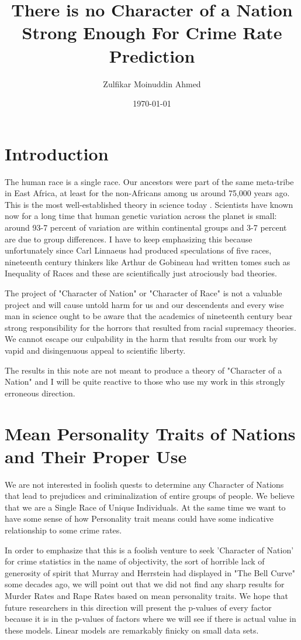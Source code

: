 \documentclass{amsart}
\title{There is no Character of a Nation Strong Enough For Crime Rate Prediction}
\author{Zulfikar Moinuddin Ahmed}
\date{\today}
\begin{document}
\maketitle

\section{Introduction}
The human race is a single race.  Our ancestors were part of the same meta-tribe in East Africa, at least for the non-Africans among us around 75,000 years ago.  This is the most well-established theory in science today \cite{SM18}.  Scientists have known now for a long time that human genetic variation across the planet is small: around 93-7 percent of variation are within continental groups and 3-7 percent are due to group differences.  I have to keep emphasizing this because unfortunately since Carl Linnaeus had produced speculations of five races, nineteenth century thinkers like Arthur de Gobineau had written tomes such as Inequality of Races and these are scientifically just atrociously bad theories.  

The project of "Character of Nation" or "Character of Race" is not a valuable project and will cause untold harm for us and our descendents and every wise man in science ought to be aware that the academics of nineteenth century bear strong responsibility for the horrors that resulted from racial supremacy theories.  We cannot escape our culpability in the harm that results from our work by vapid and disingenuous appeal to scientific liberty.  

The results in this note are not meant to produce a theory of "Character of a Nation" and I will be quite reactive to those who use my work in this strongly erroneous direction.  

\section{Mean Personality Traits of Nations and Their Proper Use}

We are not interested in foolish quests to determine any Character of Nations that lead to prejudices and criminalization of entire groups of people.  We believe that we are a Single Race of Unique Individuals.  At the same time we want to have some sense of how Personality trait means could have some indicative relationship to some crime rates.  

In order to emphasize that this is a foolish venture to seek 'Character of Nation' for crime statistics in the name of objectivity, the sort of horrible lack of generosity of spirit that Murray and Herrstein had displayed in "The Bell Curve" some decades ago, we will point out that we did not find any sharp results for Murder Rates and Rape Rates based on mean personality traits.  We hope that future researchers in this direction will present the p-values of every factor because it is in the p-values of factors where we will see if there is actual value in these models.  Linear models are remarkably finicky on small data sets.
\end{document}
